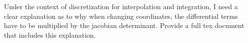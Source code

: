 \documentclass{article}
\begin{document}
Under the context of discretization for interpolation and integration, I need a
clear explanation as to why when changing coordinates, the differential terms
have to be multiplied by the jacobian determinant. Provide a full tex document
that includes this explanation.
\end{document}
